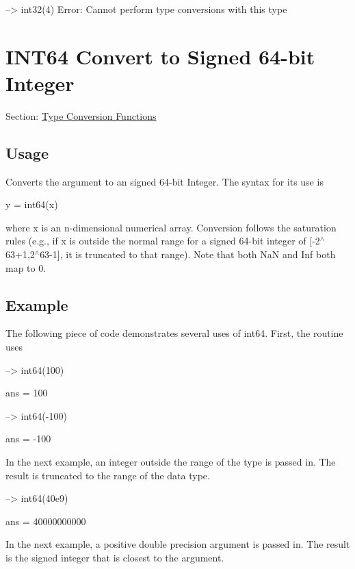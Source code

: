 \begin{DoxyVerbInclude}
--> int32({4})
Error: Cannot perform type conversions with this type
\end{DoxyVerbInclude}
 \hypertarget{typecast_int64}{}\section{I\-N\-T64 Convert to Signed 64-\/bit Integer}\label{typecast_int64}
Section\-: \hyperlink{sec_typecast}{Type Conversion Functions} \hypertarget{vtkwidgets_vtkxyplotwidget_Usage}{}\subsection{Usage}\label{vtkwidgets_vtkxyplotwidget_Usage}
Converts the argument to an signed 64-\/bit Integer. The syntax for its use is \begin{DoxyVerb}   y = int64(x)
\end{DoxyVerb}
 where {\ttfamily x} is an {\ttfamily n}-\/dimensional numerical array. Conversion follows the saturation rules (e.\-g., if {\ttfamily x} is outside the normal range for a signed 64-\/bit integer of {\ttfamily \mbox{[}-\/2$^\wedge$63+1,2$^\wedge$63-\/1\mbox{]}}, it is truncated to that range). Note that both {\ttfamily Na\-N} and {\ttfamily Inf} both map to 0. \hypertarget{variables_struct_Example}{}\subsection{Example}\label{variables_struct_Example}
The following piece of code demonstrates several uses of {\ttfamily int64}. First, the routine uses


\begin{DoxyVerbInclude}
--> int64(100)

ans = 
 100 

--> int64(-100)

ans = 
 -100 
\end{DoxyVerbInclude}


In the next example, an integer outside the range of the type is passed in. The result is truncated to the range of the data type.


\begin{DoxyVerbInclude}
--> int64(40e9)

ans = 
 40000000000 
\end{DoxyVerbInclude}


In the next example, a positive double precision argument is passed in. The result is the signed integer that is closest to the argument.


